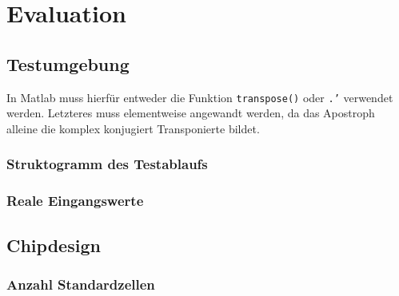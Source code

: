  
 






  
 \chapter{Evaluation}
 


 \section{Testumgebung}

In Matlab muss hierfür entweder die Funktion \texttt{transpose()} oder \texttt{.'} verwendet werden. Letzteres muss elementweise angewandt werden, da das Apostroph
alleine die komplex konjugiert Transponierte bildet.

 
 \subsection{Struktogramm des Testablaufs}
 \subsection{Reale Eingangswerte}
 
 \section{Chipdesign}
 \subsection{Anzahl Standardzellen}
 
